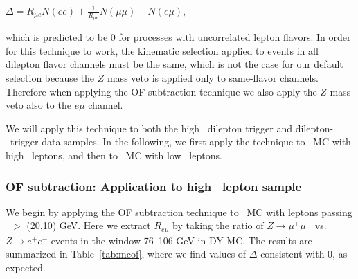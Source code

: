 \begin{center}
$\Delta = R_{\mu e}N(ee) + \frac{1}{R_{\mu e}}N(\mu\mu) - N(e\mu)$,
\end{center}

which is predicted to be 0 for processes with uncorrelated lepton flavors. In order
for this technique to work, the kinematic selection applied to events in all dilepton
flavor channels must be the same, which is not the case for our default selection because the
$Z$ mass veto is applied only to same-flavor channels. Therefore when applying the OF
subtraction technique we also apply the $Z$ mass veto also to the $e\mu$ channel. 

We will apply this technique to both the high \pt\ dilepton trigger and dilepton-\Ht\ trigger data samples.
In the following, we first apply the technique to \ttbar\ MC with high \pt\ leptons, and then
to \ttbar\ MC with low \pt\ leptons.

\subsubsection{OF subtraction: Application to high \pt\ lepton sample}

We begin by applying the OF subtraction technique to \ttbar\ MC with leptons passing \pt\ $>$ (20,10) GeV.
Here we extract $R_{e\mu}$ by taking the ratio of $Z \to \mu^+\mu^-$ vs. $Z \to e^+e^-$ events in the
window 76--106 GeV in DY MC. The results are summarized in Table~\ref{tab:mcof}, where we find
values of $\Delta$ consistent with 0, as expected.

